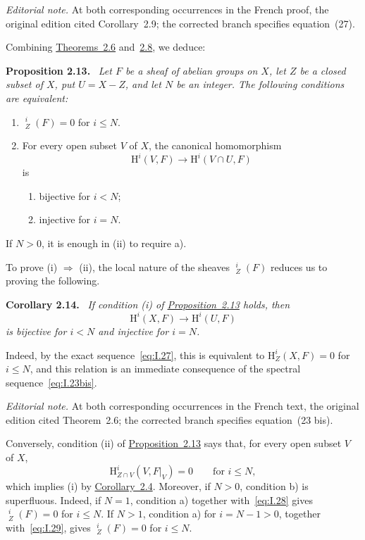 \documentclass[11pt,a4paper,oneside]{book}
\providecommand{\srcpage}[1]{%
  \marginpar{\raggedright\scriptsize\color{gray}Original French p.~#1}}
\providecommand{\uH}{\mathop{\underline{\mathrm H}}\nolimits}
\providecommand{\restr}[2]{#1\vert_{#2}}
\newenvironment{sgastatement}[1]
  {\par\addvspace{0.8\baselineskip}\noindent\textbf{#1.}\ \itshape}
  {\par\addvspace{0.35\baselineskip}}
\theoremstyle{plain}
\theoremstyle{definition}
\theoremstyle{remark}
\begin{document}
\noindent\textit{Editorial note.} At both corresponding occurrences in the
French proof, the original edition cited Corollary~2.9; the corrected branch
specifies equation~(27).

Combining \hyperref[I.2.6]{Theorems~2.6} and~\hyperref[I.2.8]{2.8}, we deduce:

\begin{sgastatement}{Proposition 2.13}
Let $F$ be a sheaf of abelian groups on $X$, let $Z$ be a closed subset of
$X$, put $U=X-Z$, and let $N$ be an integer. The following conditions are
equivalent:
\begin{enumerate}[label=\textup{(\roman*)},leftmargin=2.7em]
  \item $\uH_Z^i(F)=0$ for $i\le N$.
  \item For every open subset $V$ of $X$, the canonical homomorphism
  \[
    \mathrm H^i(V,F)\longrightarrow\mathrm H^i(V\cap U,F)
  \]
  is
  \begin{enumerate}[label=\textup{\alph*)},leftmargin=2.5em]
    \item bijective for $i<N$;
    \item injective for $i=N$.
  \end{enumerate}
\end{enumerate}
If $N>0$, it is enough in \textup{(ii)} to require \textup{a)}.
\end{sgastatement}

To prove \textup{(i)} $\Rightarrow$ \textup{(ii)}, the local nature of the
sheaves $\uH_Z^i(F)$ reduces us to proving the following.

\begin{sgastatement}{Corollary 2.14}
If condition \textup{(i)} of \hyperref[I.2.13]{Proposition~2.13} holds, then
\[
  \mathrm H^i(X,F)\longrightarrow\mathrm H^i(U,F)
\]
is bijective for $i<N$ and injective for $i=N$.
\end{sgastatement}

Indeed, by the exact sequence~\eqref{eq:I.27}, this is equivalent to
$\mathrm H_Z^i(X,F)=0$ for $i\le N$, and this\srcpage{18} relation is an
immediate consequence of the spectral sequence~\eqref{eq:I.23bis}.

\noindent\textit{Editorial note.} At both corresponding occurrences in the
French text, the original edition cited Theorem~2.6; the corrected branch
specifies equation~(23 bis).

Conversely, condition \textup{(ii)} of \hyperref[I.2.13]{Proposition~2.13} says that, for every
open subset $V$ of $X$,
\[
  \mathrm H_{Z\cap V}^i(V,\restr{F}{V})=0
  \qquad\text{for }i\le N,
\]
which implies \textup{(i)} by \hyperref[I.2.4]{Corollary~2.4}. Moreover, if $N>0$, condition
\textup{b)} is superfluous. Indeed, if $N=1$, condition \textup{a)} together
with~\eqref{eq:I.28} gives $\uH_Z^i(F)=0$ for $i\le N$. If $N>1$,
condition \textup{a)} for $i=N-1>0$, together with~\eqref{eq:I.29}, gives
$\uH_Z^i(F)=0$ for $i\le N$.
\end{document}
